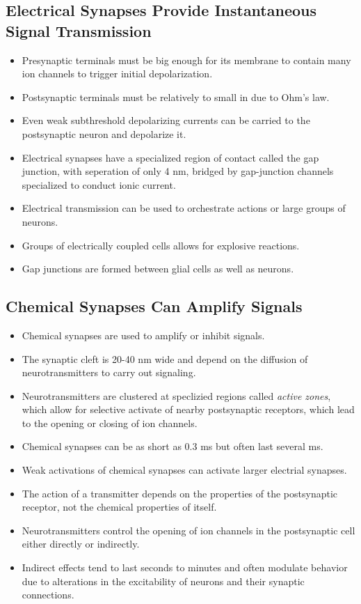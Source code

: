 \documentclass[12pt,a4paper]{article}
\begin{document}
\subsection{Electrical Synapses Provide Instantaneous Signal Transmission}
\begin{itemize}
    \item Presynaptic terminals must be big enough for its membrane to contain many ion channels to trigger initial depolarization.
    \item Postsynaptic terminals must be relatively to small in due to Ohm's law.
    \item Even weak subthreshold depolarizing currents can be carried to the postsynaptic neuron and depolarize it.
    \item Electrical synapses have a specialized region of contact called the gap junction, with seperation of only 4 nm, bridged by gap-junction channels specialized to conduct ionic current.
    \item Electrical transmission can be used to orchestrate actions or large groups of neurons.
    \item Groups of electrically coupled cells allows for explosive reactions.
    \item Gap junctions are formed between glial cells as well as neurons.
\end{itemize}
\subsection{Chemical Synapses Can Amplify Signals}
\begin{itemize}
    \item Chemical synapses are used to amplify or inhibit signals. 
    \item The synaptic cleft is 20-40 nm wide and depend on the diffusion of neurotransmitters to carry out signaling.
    \item Neurotransmitters are clustered at speclizied regions called \textit{active zones}, which allow for selective activate of nearby postsynaptic receptors, which lead to the opening or closing of ion channels.
    \item Chemical synapses can be as short as 0.3 ms but often last several ms.
    \item Weak activations of chemical synapses can activate larger electrial synapses. 
    \item The action of a transmitter depends on the properties of the postsynaptic receptor, not the chemical properties of itself.
    \item Neurotransmitters control the opening of ion channels in the postsynaptic cell either directly or indirectly.
    \item Indirect effects tend to last seconds to minutes and often modulate behavior due to alterations in the excitability of neurons and their synaptic connections.
\end{itemize}
\end{document}
